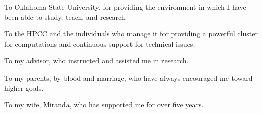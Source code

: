 
To Oklahoma State University, for providing the environment in which I have been able to study, teach, and research.

To the HPCC and the individuals who manage it for providing a powerful cluster for computations and continuous support for technical issues.

To my advisor, who instructed and assisted me in research.

To my parents, by blood and marriage, who have always encouraged me toward higher goals.

To my wife, Miranda, who has supported me for over five years. 

